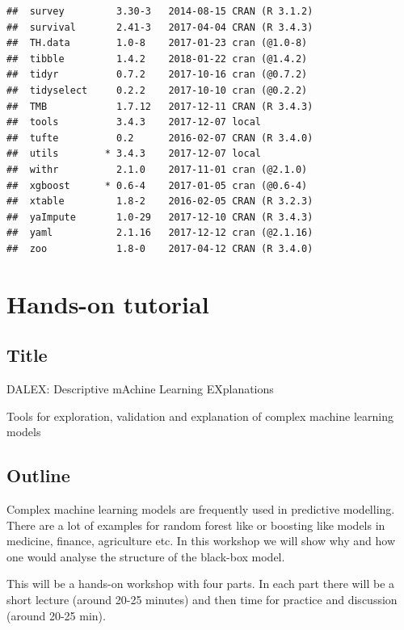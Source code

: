 \documentclass[]{book}
\theoremstyle{definition}
\theoremstyle{definition}
\theoremstyle{definition}
\theoremstyle{remark}
\begin{document}
\begin{verbatim}
##  survey         3.30-3   2014-08-15 CRAN (R 3.1.2)                        
##  survival       2.41-3   2017-04-04 CRAN (R 3.4.3)                        
##  TH.data        1.0-8    2017-01-23 cran (@1.0-8)                         
##  tibble         1.4.2    2018-01-22 cran (@1.4.2)                         
##  tidyr          0.7.2    2017-10-16 cran (@0.7.2)                         
##  tidyselect     0.2.2    2017-10-10 cran (@0.2.2)                         
##  TMB            1.7.12   2017-12-11 CRAN (R 3.4.3)                        
##  tools          3.4.3    2017-12-07 local                                 
##  tufte          0.2      2016-02-07 CRAN (R 3.4.0)                        
##  utils        * 3.4.3    2017-12-07 local                                 
##  withr          2.1.0    2017-11-01 cran (@2.1.0)                         
##  xgboost      * 0.6-4    2017-01-05 cran (@0.6-4)                         
##  xtable         1.8-2    2016-02-05 CRAN (R 3.2.3)                        
##  yaImpute       1.0-29   2017-12-10 CRAN (R 3.4.3)                        
##  yaml           2.1.16   2017-12-12 cran (@2.1.16)                        
##  zoo            1.8-0    2017-04-12 CRAN (R 3.4.0)
\end{verbatim}

\chapter{Hands-on tutorial}\label{hands-on-tutorial}

\section{Title}\label{title}

DALEX: Descriptive mAchine Learning EXplanations

Tools for exploration, validation and explanation of complex machine
learning models

\section{Outline}\label{outline}

Complex machine learning models are frequently used in predictive
modelling. There are a lot of examples for random forest like or
boosting like models in medicine, finance, agriculture etc. In this
workshop we will show why and how one would analyse the structure of the
black-box model.

This will be a hands-on workshop with four parts. In each part there
will be a short lecture (around 20-25 minutes) and then time for
practice and discussion (around 20-25 min).
\end{document}
